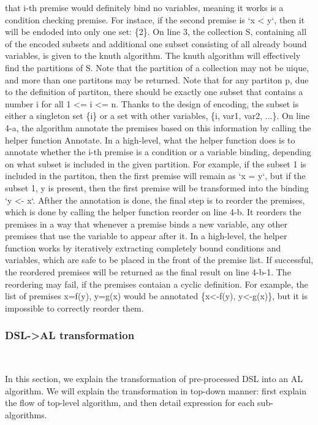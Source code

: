 that i-th premise would definitely bind no variables, meaning it works is a condition checking premise.
For instace, if the second premise is `x < y`, then it will be endoded into only one set: \{2\}.
On line 3, the collection S, containing all of the encoded subsets and additional one subset consisting of
all already bound variables, is given to the knuth algorithm. The knuth algorithm will
effectively find the partitions of S. Note that the partition of a collection may not be uique, and
more than one partitons may be returned. Note that for any partiton p, due to the definition of partiton,
there should be exactly one subset that contains a number i for all 1 <= i <= n. Thanks to the
design of encoding, the subset is either a singleton set \{i\} or a set with other variables,
\{i, var1, var2, ...\}. On line 4-a, the algorithm annotate the premises based on this information by calling
the helper function Annotate. In a high-level, what the helper function does is to annotate whether
the i-th premise is a condition or
a variable binding, depending on what subset is included in the given partition. For example, if the
subset {1} is included in the partiton, then the first premise will remain as `x = y`, but if the
subset {1, y} is present, then the first premise will be transformed into the binding `y <- x`.
Afther the annotation is done, the final step is to reorder the premises, which is done by calling the helper
function reorder on line 4-b. It reorders the premises in a way that whenever a premise binds a new variable,
any other premises that use the variable to appear after it.
In a high-level, the helper function works by iteratively extracting completely bound
conditions and variables, which are safe to be placed in the front of the premise list.
If successful, the reordered premises will be returned as the final result on
line 4-b-1.  The reordering may fail, if the premises contaian a cyclic
definition.  For example, the list of premises {x=f(y), y=g(x)} would be
annotated \{x<-f(y), y<-g(x)\}, but it is impossible to correctly reorder them. 


\subsubsection{\textbf{DSL->AL transformation}}~

In this section, we explain the transformation of pre-processed DSL into an AL algorithm.
We will explain the transformation in top-down manner:
first explain the flow of top-level algorithm,
and then detail expression for each sub-algorithms.

